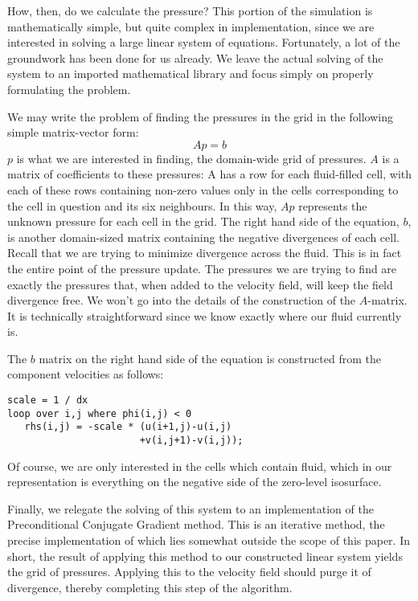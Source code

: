 How, then, do we calculate the pressure? This portion of the simulation is mathematically simple, but quite complex in implementation, since we are interested in solving a large linear system of equations.
Fortunately, a lot of the groundwork has been done for us already. We leave the actual solving of the system to an imported mathematical library and focus simply on properly formulating the problem.

We may write the problem of finding the pressures in the grid in the following simple matrix-vector form:
\begin{equation}
Ap = b
\end{equation}
$p$ is what we are interested in finding, the domain-wide grid of pressures. $A$ is a matrix of coefficients to these pressures: A has a row for each fluid-filled cell, with each of these rows containing non-zero values only in the cells corresponding to the cell in question and its six neighbours. In this way, $Ap$ represents the unknown pressure for each cell in the grid. The right hand side of the equation, $b$, is another domain-sized matrix containing the negative divergences of each cell. Recall that we are trying to minimize divergence across the fluid. This is in fact the entire point of the pressure update. The pressures we are trying to find are exactly the pressures that, when added to the velocity field, will keep the field divergence free.
We won't go into the details of the construction of the $A$-matrix. It is technically straightforward since we know exactly where our fluid currently is. 

The $b$ matrix on the right hand side of the equation is constructed from the component velocities as follows:
\begin{lstlisting}
scale = 1 / dx
loop over i,j where phi(i,j) < 0
   rhs(i,j) = -scale * (u(i+1,j)-u(i,j)
                       +v(i,j+1)-v(i,j));
\end{lstlisting}
Of course, we are only interested in the cells which contain fluid, which in our representation is everything on the negative side of the zero-level isosurface.

Finally, we relegate the solving of this system to an implementation of the Preconditional Conjugate Gradient method. This is an iterative method, the precise implementation of which lies somewhat outside the scope of this paper. In short, the result of applying this method to our constructed linear system yields the grid of pressures. Applying this to the velocity field should purge it of divergence, thereby completing this step of the algorithm.


